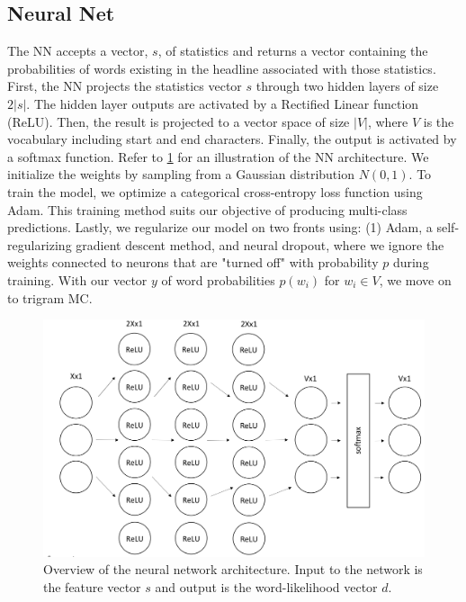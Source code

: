 \documentclass[12pt, journal]{IEEEtran}
\begin{document}
\subsection{Neural Net} 
The NN accepts a vector, $s$, of statistics and returns a vector containing the probabilities of words existing in the headline associated with those statistics. First, the NN projects the statistics vector $s$ through two hidden layers of size $2|s|$. The hidden layer outputs are activated by a Rectified Linear function (ReLU). Then, the result is projected to a vector space of size $|V|$, where $V$ is the vocabulary including start and end characters. Finally, the output is activated by a softmax function. Refer to \ref{NN} for an illustration of the NN architecture. We initialize the weights by sampling from a Gaussian distribution $N(0,1)$. To train the model, we optimize a categorical cross-entropy loss function using Adam. This training method suits our objective of producing multi-class predictions. Lastly, we regularize our model on two fronts using: (1) Adam, a self-regularizing gradient descent method, and neural dropout, where we ignore the weights connected to neurons that are "turned off" with probability $p$ during training. With our vector $y$ of word probabilities $p(w_i)$ for $w_i \in V$, we move on to trigram MC.

\begin{figure}[h!]
\centering
\includegraphics[width=.6\textwidth]{NN.png}
\caption{Overview of the neural network architecture. Input to the network is the feature vector $s$ and output is the word-likelihood vector $d$.}
\label{NN}
\end{figure}
\end{document}
